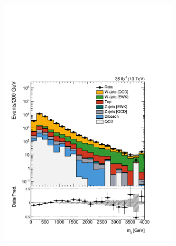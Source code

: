 \begin{figure}[]
\begin{center}
\begin{subfigure}[t]{0.24\textwidth}
            \includegraphics[width=\textwidth]{figures/vbf/prefit/singlemuon_jot12Mass_logy.pdf}
        \end{subfigure}
        \begin{subfigure}[t]{0.24\textwidth}

\end{subfigure}
\end{center}
\end{figure}
